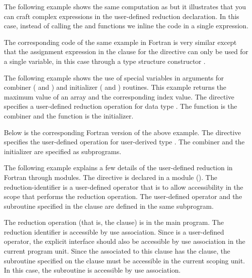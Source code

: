 

The following example shows the same computation as  but it illustrates that you can craft complex expressions in the user-defined 
reduction declaration. In this case, instead of calling the  
and  functions we inline the code in a single expression.


The corresponding code of the same example in Fortran is very similar
except that the assignment expression in the  clause for
the 
directive can only be used for a single variable, in this case through
a type structure constructor .



The following example shows the use of special variables in arguments for 
combiner ( and ) and initializer 
( and ) routines.  This example returns 
the maximum value of an array and the corresponding index value. The 
 directive specifies a user-defined 
reduction operation  for data type . 
The function  is the combiner and the function  
is the initializer.


Below is the corresponding Fortran version of the above example.  
The  directive specifies the user-defined 
operation  for user-derived type .  
The combiner  and the initializer  are 
specified as subprograms.



The following example explains a few details of the user-defined reduction 
in Fortran through modules. The  directive 
is declared in a module (). 
The reduction-identifier  is a user-defined operator that is
to allow accessibility in the scope that performs the reduction
operation.
The user-defined operator  and the subroutine  
specified in the  clause are defined in the same subprogram.

The reduction operation (that is, the  clause) is in the main program.
The reduction identifier  is accessible by use association.
Since  is a user-defined operator, the explicit interface
should also be accessible by use association in the current
program unit.
Since the  associated to this  clause
has the  clause, the subroutine specified on the clause
must be accessible in the current scoping unit.  In this case,
the subroutine  is accessible by use association.

